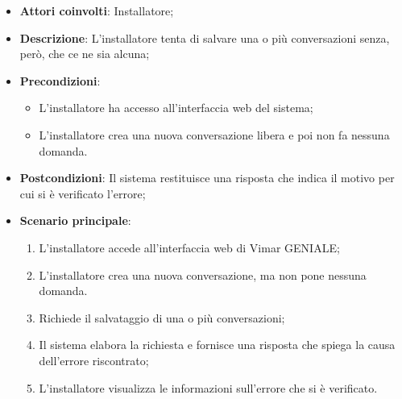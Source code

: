 \begin{itemize}
    \item \textbf{Attori coinvolti}: Installatore;
    \item \textbf{Descrizione}: L’installatore tenta di salvare una o più conversazioni senza, però, che ce ne sia alcuna;
    \item \textbf{Precondizioni}: 
        \begin{itemize}
            \item L’installatore ha accesso all’interfaccia web del sistema;
            \item L'installatore crea una nuova conversazione libera e poi non fa nessuna domanda.
        \end{itemize}
    \item \textbf{Postcondizioni}: Il sistema restituisce una risposta che indica il motivo per cui si è verificato l’errore;
    \item \textbf{Scenario principale}:
    \begin{enumerate}
    \item L’installatore accede all’interfaccia web di Vimar GENIALE;
    \item L'installatore crea una nuova conversazione, ma non pone nessuna domanda.
    \item Richiede il salvataggio di una o più conversazioni;
    \item Il sistema elabora la richiesta e fornisce una risposta che spiega la causa dell'errore riscontrato;
    \item L’installatore visualizza le informazioni sull’errore che si è verificato.
    \end{enumerate}
\end{itemize}

